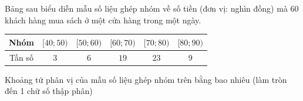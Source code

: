 \begin{bt}%

	Bảng sau biểu diễn mẫu số liệu ghép nhóm về số tiền (đơn vị: nghìn đồng) mà $60$ khách hàng mua sách ở một cửa hàng trong một ngày.
	\begin{center}
		\begin{tabular}{|c|c|c|c|c|c|}
			\hline Nhóm  &$[40 ; 50)$ & {$[50 ; 60)$} & {$[60 ; 70)$} &	{$[70 ; 80)$} &	{$[80 ; 90)$} \\
			\hline Tần số & $3$ & $6$ & $19$ & $23$ &$9$\\
			\hline
		\end{tabular}
	\end{center}
	Khoảng tứ phân vị của mẫu số liệu ghép nhóm trên bằng bao nhiêu (làm tròn đến 1 chữ số thập phân)
\end{bt}

